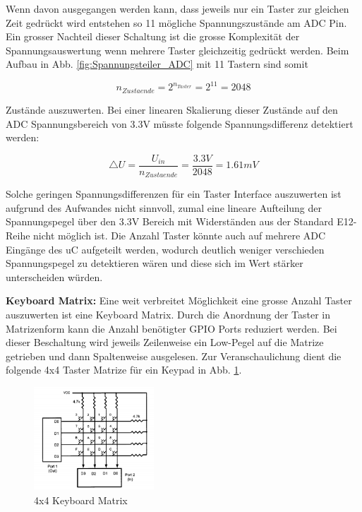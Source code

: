 Wenn davon ausgegangen werden kann, dass jeweils nur ein Taster zur gleichen Zeit gedrückt wird entstehen so 11 mögliche Spannungszustände am ADC Pin. Ein grosser Nachteil dieser Schaltung ist die grosse Komplexität der Spannungsauswertung wenn mehrere Taster gleichzeitig gedrückt werden. Beim Aufbau in Abb. \ref{fig:Spannungsteiler_ADC} mit 11 Tastern sind somit

\begin{equation}\label{nZustaende}
n_{Zustaende} = 2^{n_{Taster}} = 2^{11} = 2048
\end{equation}

Zustände auszuwerten. Bei einer linearen Skalierung dieser Zustände auf den ADC Spannungsbereich von 3.3V müsste folgende Spannungsdifferenz detektiert werden:

\begin{equation}\label{deltaU}
\bigtriangleup U = \frac{U_{in}}{n_{Zustaende}} = \frac{3.3V}{2048} = 1.61mV
\end{equation}

Solche geringen Spannungsdifferenzen für ein Taster Interface auszuwerten ist aufgrund des Aufwandes nicht sinnvoll, zumal eine lineare Aufteilung der Spannungspegel über den 3.3V Bereich mit Widerständen aus der Standard E12-Reihe nicht möglich ist. Die Anzahl Taster könnte auch auf mehrere ADC Eingänge des uC aufgeteilt werden, wodurch deutlich weniger verschieden Spannungspegel zu detektieren wären und diese sich im Wert stärker unterscheiden würden.\newline

\textbf{Keyboard Matrix:} Eine weit verbreitet Möglichkeit eine grosse Anzahl Taster auszuwerten ist eine Keyboard Matrix. Durch die Anordnung der Taster in Matrizenform kann die Anzahl benötigter GPIO Ports reduziert werden. Bei dieser Beschaltung wird jeweils Zeilenweise ein Low-Pegel auf die Matrize getrieben und dann Spaltenweise ausgelesen. Zur Veranschaulichung dient die folgende 4x4 Taster Matrize für ein Keypad in Abb. \ref{fig:Keyboard_Matrix}.

\begin{figure}[H]
	\includegraphics[width=0.4\textwidth]{Illustrationen/6-Umsetzung/Keyboard_Matrix.png}
	\caption{4x4 Keyboard Matrix \protect\cite{Keyboard_Matrix}}
	\label{fig:Keyboard_Matrix}
\end{figure}

